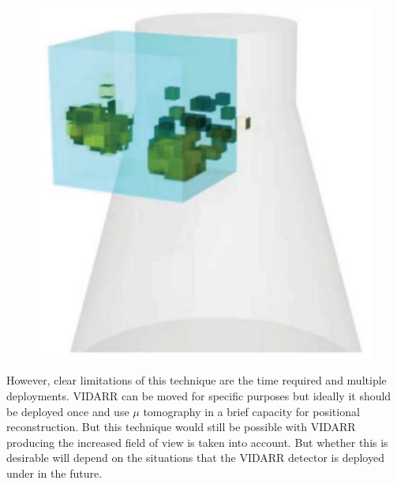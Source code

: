 \begin{figure}[!h]
\begin{minipage}{.45\textwidth}
  \includegraphics[width=\linewidth]{Chapter5/Figs/MuTomographyExamples/3dImagingNFSP.jpg}
  \label{fig:3dImagingNFSP}
\end{minipage}
\end{figure}

However, clear limitations of this technique are the time required and multiple deployments. VIDARR can be moved for specific purposes but ideally it should be deployed once and use $\mu$ tomography in a brief capacity for positional reconstruction. But this technique would still be possible with VIDARR producing the increased field of view is taken into account. But whether this is desirable will depend on the situations that the VIDARR detector is deployed under in the future. 


